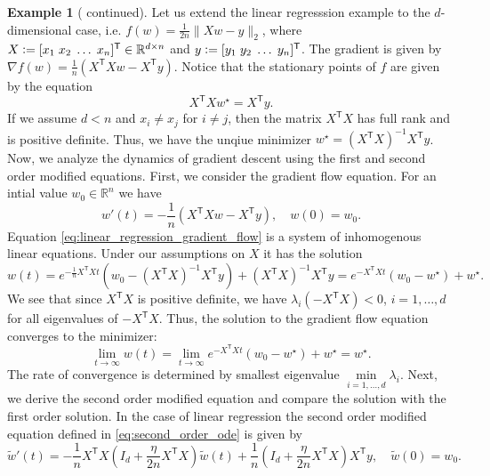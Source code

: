 \documentclass[12pt]{article}
\theoremstyle{definition}
\newtheorem{example}[example]{Example}
\numberwithin{equation}{section}
\newcommand{\R}{\mathbb{R}}
\newcommand{\T}{\mathsf{T}}
\newcommand{\norm}[1]{\lVert{#1}\rVert_2}
\newcommand{\defeq}{\vcentcolon=}
\begin{document}
\begin{example}[ continued]
  Let us extend the linear regresssion example to the $d$-dimensional case, i.e. $f(w)=\frac{1}{2n} \norm{Xw - y}$, where $X \defeq [x_1\;x_2\;\dots\;x_n]^\T \in \R^{d \times n}$ and $y \defeq [y_1\;y_2\;\dots\;y_n]^\T$. 
  The gradient is given by $\nabla f(w) = \frac{1}{n}\left(X^\T Xw - X^\T y\right)$. 
  Notice that the stationary points of $f$ are given by the equation
  \begin{equation*}
    X^\T Xw^\star = X^\T y.
  \end{equation*}
  If we assume $d < n$ and $x_i \neq x_j$ for $i \neq j$, then the matrix $X^\T X$ has full rank and is positive definite. Thus, we have the unqiue minimizer $w^\star = (X^\T X)^{-1}X^\T y$.
  Now, we analyze the dynamics of gradient descent using the first and second order modified equations. First, we consider the gradient flow equation.
  For an intial value $w_0 \in \R^n$ we have 
  \begin{equation}
    \label{eq:linear_regression_gradient_flow}
    w'(t) = -\frac{1}{n}\left(X^\T Xw - X^\T y\right), \quad w(0) = w_0.
  \end{equation}
  Equation \eqref{eq:linear_regression_gradient_flow} is a system of inhomogenous linear equations. Under our assumptions on $X$ it has the solution
  \begin{equation*}
    w(t) = e^{-\frac{1}{n}X^\T Xt}(w_0 - (X^\T X)^{-1}X^\T y) + (X^\T X)^{-1}X^\T y = e^{-X^\T Xt}(w_0 - w^\star) + w^\star.
  \end{equation*}
  We see that since $X^\T X$ is positive definite, we have $\lambda_i(-X^\T X) < 0$, $i = 1, \dots, d$ for all eigenvalues of $-X^\T X$. Thus, the solution to the gradient flow equation converges to the minimizer:
  \begin{equation*}
    \lim_{t \rightarrow \infty} w(t) = \lim_{t \rightarrow \infty} e^{-X^\T Xt}(w_0 - w^\star) + w^\star = w^\star.
  \end{equation*}
  The rate of convergence is determined by smallest eigenvalue $\min\limits_{i=1,\dots,d}\lambda_i$. Next, we derive the second order modified equation and compare the solution with the first order solution. In the case of linear regression the second order modified equation defined in \eqref{eq:second_order_ode} is given by
  \begin{equation*}
    \widetilde{w}'(t) = -\frac{1}{n}X^\T X \left(I_d + \frac{\eta}{2n}X^\T X\right)\widetilde{w}(t) + \frac{1}{n}\left(I_d + \frac{\eta}{2n} X^\T X\right)X^\T y, \quad \widetilde{w}(0) = w_0.

\end{equation*}
\end{example}
\end{document}
